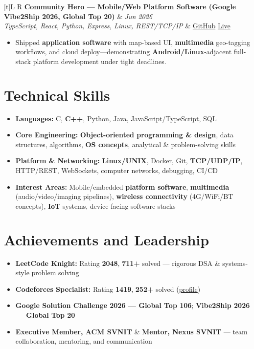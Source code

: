 \documentclass[a4paper,10pt]{article}
\newcommand{\resumeProject}[4]{%
  \vspace{0.5mm}
  \noindent
  \begin{tabularx}{\textwidth}[t]{L R}
    \textbf{#1} & \textit{#3} \\
    \textit{#2} & #4 \\
  \end{tabularx}
  \vspace{-0.5mm}%
}
\begin{document}
\resumeProject
  {Community Hero --- Mobile/Web Platform Software (Google Vibe2Ship 2026, Global Top 20)}
  {TypeScript, React, Python, Express, Linux, REST/TCP/IP}
  {Jun 2026}
  {\href{https://github.com/Ojas-Srivastava05/community-hero}{GitHub} \textbar{} \href{https://community-hero-987477089222.asia-south1.run.app/}{Live}}
\begin{itemize}
  \item Shipped \textbf{application software} with map-based UI, \textbf{multimedia} geo-tagging workflows, and cloud deploy---demonstrating \textbf{Android/Linux}-adjacent full-stack platform development under tight deadlines.
\end{itemize}

\section{Technical Skills}
\small
\begin{itemize}[label={}]
  \item \textbf{Languages:} C, \textbf{C++}, Python, Java, JavaScript/TypeScript, SQL
  \item \textbf{Core Engineering:} \textbf{Object-oriented programming \& design}, data structures, algorithms, \textbf{OS concepts}, analytical \& problem-solving skills
  \item \textbf{Platform \& Networking:} \textbf{Linux/UNIX}, Docker, Git, \textbf{TCP/UDP/IP}, HTTP/REST, WebSockets, computer networks, debugging, CI/CD
  \item \textbf{Interest Areas:} Mobile/embedded \textbf{platform software}, \textbf{multimedia} (audio/video/imaging pipelines), \textbf{wireless connectivity} (4G/WiFi/BT concepts), \textbf{IoT} systems, device-facing software stacks
\end{itemize}

\section{Achievements and Leadership}
\small
\begin{itemize}
  \item \textbf{LeetCode Knight:} Rating \textbf{2048}, \textbf{711+} solved --- rigorous DSA \& systems-style problem solving
  \item \textbf{Codeforces Specialist:} Rating \textbf{1419}, \textbf{252+} solved (\href{https://codeforces.com/profile/Oju}{profile})
  \item \textbf{Google Solution Challenge 2026 --- Global Top 106}; \textbf{Vibe2Ship 2026 --- Global Top 20}
  \item \textbf{Executive Member, ACM SVNIT} \& \textbf{Mentor, Nexus SVNIT} --- team collaboration, mentoring, and communication
\end{itemize}
\end{document}
